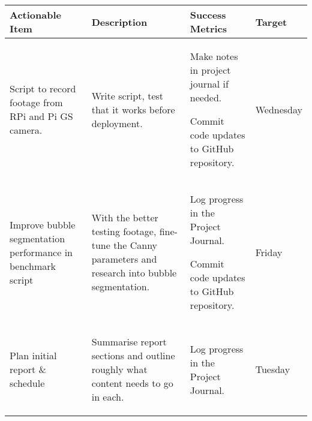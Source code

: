 \begin{table}[!h]
    \centering
    \begin{tabularx}{\textwidth}{|X|X|X|l|}
        \hline
        Actionable Item & Description & Success Metrics & Target \\
        \hline
        \hline
        Script to record footage from RPi and Pi GS camera. &
        \begin{myitemize}
            \item Write script, test that it works before deployment.
        \end{myitemize} &
        \begin{myitemize}
            \item Make notes in project journal if needed.
            \item Commit code updates to GitHub repository.
        \end{myitemize} &
        Wednesday \\
        \hline
        Improve bubble segmentation performance in benchmark script &
        \begin{myitemize}
            \item With the better testing footage, fine-tune the Canny parameters and research into bubble segmentation.
        \end{myitemize} &
        \begin{myitemize}
            \item Log progress in the Project Journal.
            \item Commit code updates to GitHub repository.
        \end{myitemize} &
        Friday \\
        \hline
        Plan initial report \& schedule &
        \begin{myitemize}
            \item Summarise report sections and outline roughly what content needs to go in each.
        \end{myitemize} &
        \begin{myitemize}
            \item Log progress in the Project Journal.
        \end{myitemize} &
        Tuesday \\
        \hline
    \end{tabularx}
\end{table}
